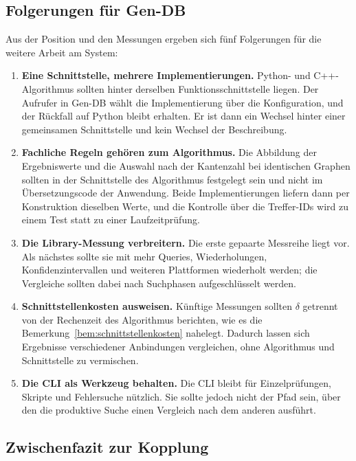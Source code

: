 \documentclass[a4paper,12pt, twoside]{report}
\theoremstyle{definition}
\begin{document}
\subsection{Folgerungen für Gen-DB}
\label{sec:fremde_folgerungen}

Aus der Position und den Messungen ergeben sich fünf Folgerungen für die weitere Arbeit am System:

\begin{enumerate}
	\item \textbf{Eine Schnittstelle, mehrere Implementierungen.} Python- und C++-Algorithmus sollten hinter derselben Funktionsschnittstelle liegen. Der Aufrufer in Gen-DB wählt die Implementierung über die Konfiguration, und der Rückfall auf Python bleibt erhalten. Er ist dann ein Wechsel hinter einer gemeinsamen Schnittstelle und kein Wechsel der Beschreibung.
	\item \textbf{Fachliche Regeln gehören zum Algorithmus.} Die Abbildung der Ergebniswerte und die Auswahl nach der Kantenzahl bei identischen Graphen sollten in der Schnittstelle des Algorithmus festgelegt sein und nicht im Übersetzungscode der Anwendung. Beide Implementierungen liefern dann per Konstruktion dieselben Werte, und die Kontrolle über die Treffer-IDs wird zu einem Test statt zu einer Laufzeitprüfung.
	\item \textbf{Die Library-Messung verbreitern.} Die erste gepaarte Messreihe liegt vor. Als nächstes sollte sie mit mehr Queries, Wiederholungen, Konfidenzintervallen und weiteren Plattformen wiederholt werden; die Vergleiche sollten dabei nach Suchphasen aufgeschlüsselt werden.
	\item \textbf{Schnittstellenkosten ausweisen.} Künftige Messungen sollten $\delta$ getrennt von der Rechenzeit des Algorithmus berichten, wie es die Bemerkung~\ref{bem:schnittstellenkosten} nahelegt. Dadurch lassen sich Ergebnisse verschiedener Anbindungen vergleichen, ohne Algorithmus und Schnittstelle zu vermischen.
	\item \textbf{Die CLI als Werkzeug behalten.} Die CLI bleibt für Einzelprüfungen, Skripte und Fehlersuche nützlich. Sie sollte jedoch nicht der Pfad sein, über den die produktive Suche einen Vergleich nach dem anderen ausführt.
\end{enumerate}

\subsection{Zwischenfazit zur Kopplung}
\label{sec:fremde_fazit}
\end{document}
